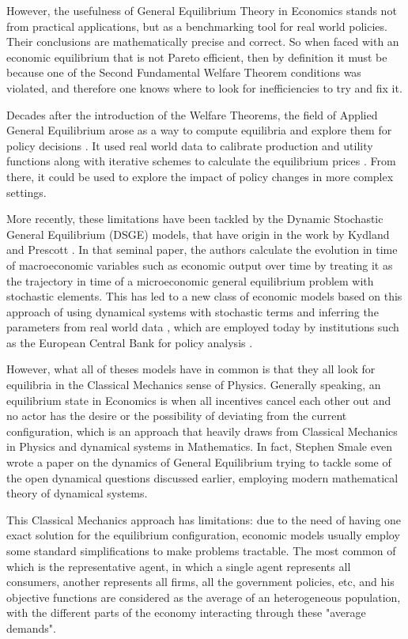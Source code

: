 However, the usefulness of General Equilibrium Theory in Economics stands not from practical applications, but as a benchmarking tool for real world policies. Their conclusions are mathematically precise and correct. So when faced with an economic equilibrium that is not Pareto efficient, then by definition it must be because one of the Second Fundamental Welfare Theorem conditions was violated, and therefore one knows where to look for inefficiencies to try and fix it.

Decades after the introduction of the Welfare Theorems, the field of Applied General Equilibrium arose as a way to compute equilibria and explore them for policy decisions \cite{shoven1984, shoven1992}. It used real world data to calibrate production and utility functions along with iterative schemes to calculate the equilibrium prices \cite{scarf1967}. From there, it could be used to explore the impact of policy changes in more complex settings.


More recently, these limitations have been tackled by the Dynamic Stochastic General Equilibrium (DSGE) models, that have origin in the work by Kydland and Prescott \cite{kydland1982}. In that seminal paper, the authors calculate the evolution in time of macroeconomic variables such as economic output over time by treating it as the trajectory in time of a microeconomic general equilibrium problem with stochastic elements. This has led to a new class of economic models based on this approach of using dynamical systems with stochastic terms and inferring the parameters from real world data \cite{christiano2005, smets2007}, which are employed today by institutions such as the European Central Bank for policy analysis \cite{smets2003}.

However, what all of theses models have in common is that they all look for equilibria in the Classical Mechanics sense of Physics. Generally speaking, an equilibrium state in Economics is when all incentives cancel each other out and no actor has the desire or the possibility of deviating from the current configuration, which is an approach that heavily draws from Classical Mechanics in Physics and dynamical systems in Mathematics. In fact, Stephen Smale even wrote a paper on the dynamics of General Equilibrium \cite{smale1976} trying to tackle some of the open dynamical questions discussed earlier, employing modern mathematical theory of dynamical systems.

This Classical Mechanics approach has limitations: due to the need of having one exact solution for the equilibrium configuration, economic models usually employ some standard simplifications to make problems tractable. The most common of which is the representative agent, in which a single agent represents all consumers, another represents all firms, all the government policies, etc, and his objective functions are considered as the average of an heterogeneous population, with the different parts of the economy interacting through these "average demands".

